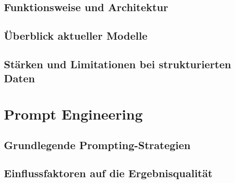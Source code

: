 \subsection{Funktionsweise und Architektur}
\label{subsec:llm-architektur}

\subsection{Überblick aktueller Modelle}
\label{subsec:llm-modelle}

\subsection{Stärken und Limitationen bei strukturierten Daten}
\label{subsec:llm-strukturierte-daten}

\section{Prompt Engineering}
\label{sec:prompting}

\subsection{Grundlegende Prompting-Strategien}
\label{subsec:prompting-strategien}

\subsection{Einflussfaktoren auf die Ergebnisqualität}
\label{subsec:prompting-einfluss}
